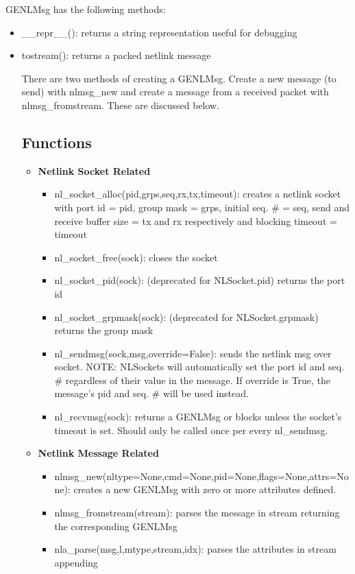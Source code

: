 \documentclass[11pt]{article}
\begin{document}
\begin{appendices}
GENLMsg has the following methods:
\begin{itemize}
\item \_\_repr\_\_(): returns a string representation useful for debugging
\item tostream(): returns a packed netlink message

There are two methods of creating a GENLMsg. Create a new message (to send) with 
nlmsg\_new and create a message from a received packet with nlmsg\_fromstream. 
These are discussed below.

\subsection{Functions}\label{sec:libnlfct}
\begin{itemize}
\item \textbf{Netlink Socket Related}
\begin{itemize}
\item nl\_socket\_alloc(pid,grps,seq,rx,tx,timeout): creates a netlink socket 
with port id = pid, group mask = grps, initial seq. \# = seq, send and receive
buffer size = tx and rx respectively and blocking timeout = timeout
\item nl\_socket\_free(sock): closes the socket
\item nl\_socket\_pid(sock): (deprecated for NLSocket.pid) returns the port id
\item nl\_socket\_grpmask(sock): (deprecated for NLSocket.grpmask) returns the 
group mask
\item nl\_sendmsg(sock,msg,override=False): sends the netlink msg over socket. 
NOTE: NLSockets will automatically set the port id and seq. \# regardless of 
their value in the message. If override is True, the message's pid and seq. \# 
will be used instead. 
\item nl\_recvmsg(sock): returns a GENLMsg or blocks unless the socket's timeout 
is set. Should only be called once per every nl\_sendmsg.
\end{itemize}
\item \textbf{Netlink Message Related}
\begin{itemize}
\item nlmsg\_new(nltype=None,cmd=None,pid=None,flags=None,attrs=None): creates a 
new GENLMsg with zero or more attributes defined. 
\item nlmsg\_fromstream(stream): parses the message in stream returning the
corresponding GENLMsg
\item nla\_parse(msg,l,mtype,stream,idx): parses the attributes in stream appending

\end{itemize}
\end{itemize}
\end{itemize}
\end{appendices}
\end{document}
